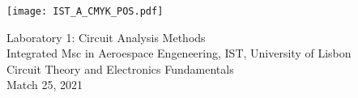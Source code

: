 \thispagestyle {empty}

\texttt{[image: IST\_A\_CMYK\_POS.pdf]}

\begin{center}
%
\vspace{1.0cm}

\vspace{1cm}
{\FontLb Laboratory 1: Circuit Analysis Methods} \\ %
\vspace{1cm}
{\FontSn Integrated Msc in Aeroespace Engeneering, IST, University of Lisbon} \\
\vspace{1cm}
{\FontSn Circuit Theory and Electronics Fundamentals} \\
\vspace{1cm}
{\FontSn Match 25, 2021} \\
%
\end{center}

